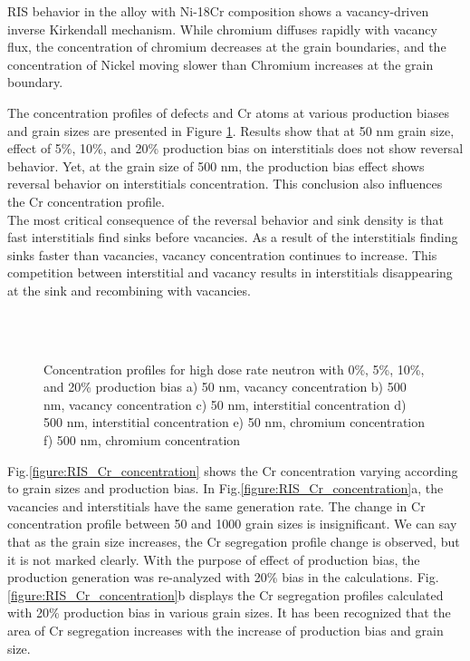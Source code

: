 \documentclass[a4paper]{article}
\begin{document}
        RIS behavior in the alloy with Ni-18Cr composition shows a vacancy-driven inverse Kirkendall mechanism. While chromium diffuses rapidly with vacancy flux, the concentration of chromium decreases at the grain boundaries, and the concentration of Nickel moving slower than Chromium increases at the grain boundary.

  \newpage

     The concentration profiles of defects and Cr atoms at various production biases and grain sizes are presented in Figure \ref{figure:RIS}. Results show that at 50 nm grain size, effect of 5\%, 10\%, and 20\% production bias on interstitials does not show reversal behavior. Yet, at the grain size of 500 nm, the production bias effect shows reversal behavior on interstitials concentration. This conclusion also influences the Cr concentration profile.\\
     The most critical consequence of the reversal behavior and sink density is that fast interstitials find sinks before vacancies. As a result of the interstitials finding sinks faster than vacancies, vacancy concentration continues to increase. This competition between interstitial and vacancy results in interstitials disappearing at the sink and recombining with vacancies.


      \begin{figure}[h!]  %
        \centering
        \\
        \\
        \caption{Concentration profiles for high dose rate neutron with 0\%, 5\%, 10\%, and 20\% production bias a) 50 nm, vacancy concentration b) 500 nm, vacancy concentration c) 50 nm, interstitial concentration d) 500 nm, interstitial concentration e) 50 nm, chromium concentration f) 500 nm, chromium concentration }
        \label{figure:RIS}
      \end{figure}

\clearpage

    Fig.\ref{figure:RIS_Cr_concentration} shows the Cr concentration varying according to grain sizes and production bias. In Fig.\ref{figure:RIS_Cr_concentration}a, the vacancies and interstitials have the same generation rate. The change in Cr concentration profile between 50 and 1000 grain sizes is insignificant. We can say that as the grain size increases, the Cr segregation profile change is observed, but it is not marked clearly. With the purpose of effect of production bias, the production generation was re-analyzed with 20\% bias in the calculations. Fig.\ref{figure:RIS_Cr_concentration}b displays the Cr segregation profiles calculated with 20\% production bias in various grain sizes.  It has been recognized that the area of Cr segregation increases with the increase of production bias and grain size.
\end{document}
